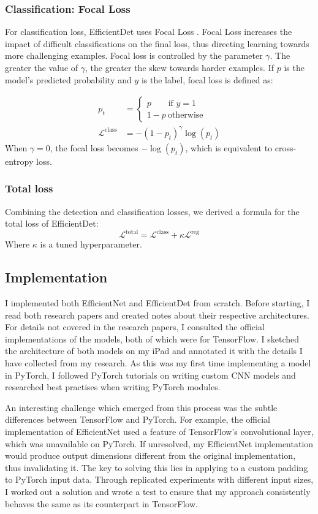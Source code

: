 \documentclass[12pt,a4paper,twoside,openany]{report}
\newcommand{\clsloss}{\mathcal{L}^\text{class}}
\newcommand{\regloss}{\mathcal{L}^\text{reg}}
\begin{document}
\subsubsection{Classification: Focal Loss}
For classification loss, EfficientDet uses Focal Loss \cite{lin_focal_2018}. Focal Loss increases the impact of difficult classifications on the final loss, thus directing learning towards more challenging examples. Focal loss is controlled by the parameter $\gamma$. The greater the value of $\gamma$, the greater the skew towards harder examples. If $p$ is the model's predicted probability and $y$ is the label, focal loss is defined as:

\begin{align}\label{eq:focal}
p_t&=\begin{cases}
    p\quad\quad\text{if }y=1\\
    1-p\ \text{otherwise}
    \end{cases}\\
\clsloss &= -(1-p_t)^\gamma \log(p_t)
\end{align}
When $\gamma=0$, the focal loss becomes $-\log(p_t)$, which is equivalent to cross-entropy loss.

\subsubsection{Total loss}
Combining the detection and classification losses, we derived a formula for the total loss of EfficientDet:
$$
\mathcal{L}^{\text{total}} = \clsloss + \kappa\regloss
$$
 Where $\kappa$ is a tuned hyperparameter. 

\subsection{Implementation}
I implemented both EfficientNet and EfficientDet from scratch. Before starting, I read both research papers and created notes about their respective architectures. For details not covered in the research papers, I consulted the official implementations of the models, both of which were for TensorFlow. I sketched the architecture of both models on my iPad and annotated it with the details I have collected from my research. As this was my first time implementing a model in PyTorch, I followed PyTorch tutorials on writing custom CNN models and researched best practises when writing PyTorch modules.

An interesting challenge which emerged from this process was the subtle differences between TensorFlow and PyTorch. For example, the official implementation of EfficientNet used a feature of TensorFlow's convolutional layer, which was unavailable on PyTorch. If unresolved, my EfficientNet implementation would produce output dimensions different from the original implementation, thus invalidating it. The key to solving this lies in applying to a custom padding to PyTorch input data. Through replicated experiments with different input sizes, I worked out a solution and wrote a test to ensure that my approach consistently behaves the same as its counterpart in TensorFlow. 
\end{document}
